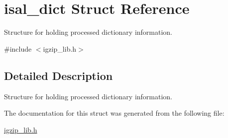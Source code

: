 \hypertarget{structisal__dict}{\section{isal\-\_\-dict Struct Reference}
\label{structisal__dict}
}


Structure for holding processed dictionary information.  




{\ttfamily \#include $<$igzip\-\_\-lib.\-h$>$}



\subsection{Detailed Description}
Structure for holding processed dictionary information. 

The documentation for this struct was generated from the following file\-:\begin{DoxyCompactItemize}
\item 
\hyperlink{igzip__lib_8h}{igzip\-\_\-lib.\-h}\end{DoxyCompactItemize}
